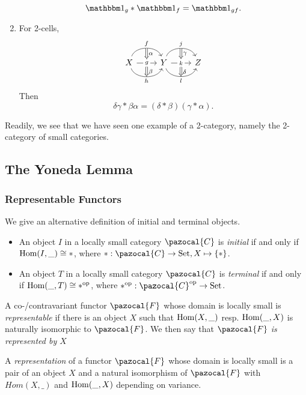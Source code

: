 \begin{definition}
\begin{enumerate}
        $$
            \fone_g\ast\fone_f = \fone_{gf}.
        $$
        \item 
        For 2-cells,
        $$
        \begin{tikzcd}
            X \arrow[r, bend left=70, "f"{name=F}] \arrow[r, "g"{name=G, description}]
            \arrow[r, bend right=70, "h"{name=H,swap}] & Y \arrow[Rightarrow, from=F, to=G, "\alpha"]\arrow[Rightarrow,from=G, to=H, "\beta"] \arrow[r, bend left=70, "j"{name=J}] \arrow[r, "k"{name=K, description}]
            \arrow[r, bend right=70, "l"{name=L,swap}] & Z \arrow[Rightarrow, from=J, to=K,"\gamma"]\arrow[Rightarrow, from=K, to=L, "\delta"]
        \end{tikzcd}
    $$
    Then 
    $$
        \delta\gamma \ast \beta\alpha = (\delta\ast \beta)(\gamma\ast \alpha).
    $$
   \end{enumerate} 
\end{definition}
Readily, we see that we have seen one example of a 2-category, namely the 2-category of small categories. 
\subsection{The Yoneda Lemma}
\subsubsection{Representable Functors}
We give an alternative definition of initial and terminal objects.
\begin{definition}
    \begin{itemize}
        \item An object $I$ in a locally small category $\pazocal{C}$ is \emph{initial} if and only if $\mathrm{Hom}(I,\_)\cong \ast$, where $\ast : \pazocal{C}\rightarrow \mathrm{Set}, X\mapsto \{\ast\}$. 
        \item An object $T$ in a locally small category $\pazocal{C}$ is \emph{terminal} if and only if $\mathrm{Hom}(\_,T)\cong \ast^\mathrm{op}$, where $\ast\op : \pazocal{C}\op\rightarrow \mathrm{Set}$. 
    \end{itemize}
\end{definition}
\begin{definition}
    A co-/contravariant functor $\pazocal{F}$ whose domain is locally small is \emph{representable} if there is an object $X$ such that $\mathrm{Hom}(X,\_)$ resp. $\mathrm{Hom}(\_,X)$ is naturally isomorphic to $\pazocal{F}$. We then say that \emph{$\pazocal{F}$ is represented by $X$}
\end{definition}
\begin{definition}
    A \emph{representation} of a functor $\pazocal{F}$ whose domain is locally small is a pair of an object $X$ and a natural isomorphism of $\pazocal{F}$ with $Hom(X,\_)$ and $\mathrm{Hom}(\_,X)$ depending on variance. 
\end{definition}
